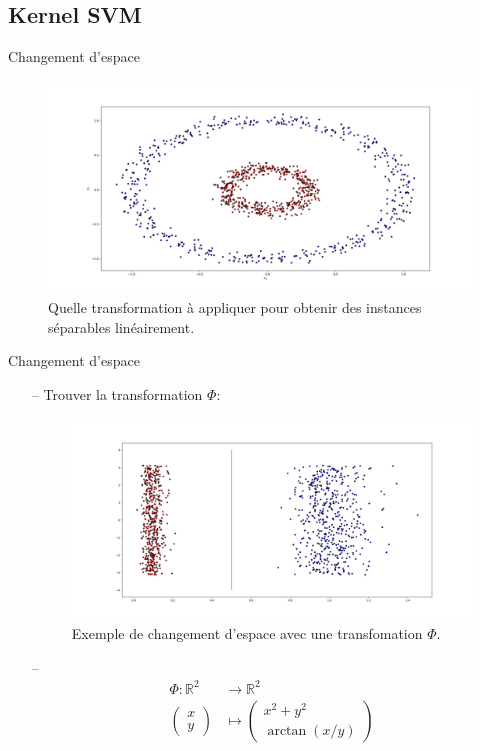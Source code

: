 \documentclass[9pt]{beamer}
\begin{document}
	\subsection[kernel]{Kernel SVM}

	\begin{frame}{Changement d'espace}
		\begin{figure}[H]
			\begin{center}
				\includegraphics[width=.7\textwidth]{circles}
				\caption{\label{fig::circles_3} Quelle transformation à appliquer pour obtenir des instances séparables linéairement.}
			\end{center}
		\end{figure}
	\end{frame}
	\begin{frame}{Changement d'espace}
		\begin{itemize}
			\item[--] Trouver la transformation $\Phi$:
			\begin{figure}[H]
				\includegraphics[width=.7\textwidth]{separation_pol}
				\caption{\label{fig::kernel_polar} Exemple de changement d'espace avec une transfomation $\Phi$.}
			\end{figure}
			\item[--] \begin{align*}
				\Phi: \mathbb{R}^2 &\rightarrow \mathbb{R}^2 \\
				\begin{pmatrix}
					x \\
					y
				\end{pmatrix} &\mapsto \begin{pmatrix}
					x^2 + y^2 \\
					\arctan(x/y)
				\end{pmatrix}
			\end{align*}
		\end{itemize}
	\end{frame}
\end{document}
